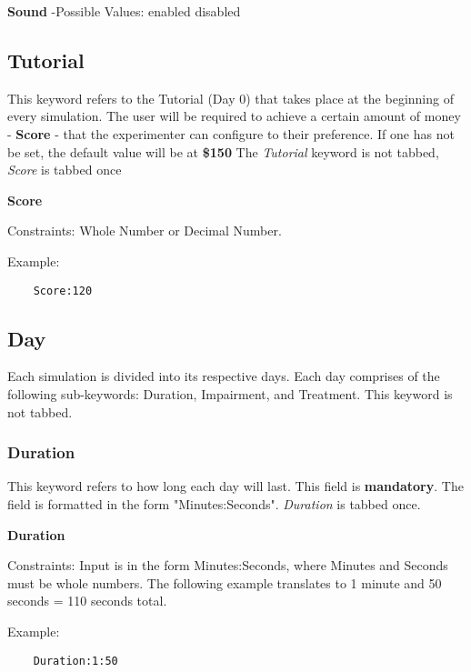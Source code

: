 \documentclass{article}
\begin{document}
\noindent \textbf{Sound} \newline
\indent -Possible Values: \newline
\indent\indent enabled \newline
\indent\indent disabled \newline

\subsection{Tutorial}
This keyword refers to the Tutorial (Day 0) that takes place at the beginning of every simulation. The user will be required to achieve a certain amount of money - \textbf{Score} - that the experimenter can configure to their preference. If one has not be set, the default value will be at \textbf{\$150} The \textit{Tutorial} keyword is not tabbed, \textit{Score} is tabbed once\newline

\noindent \textbf{Score}

\indent Constraints: Whole Number or Decimal Number.\newline

\noindent Example:
\begin{lstlisting}
    Score:120
\end{lstlisting}


\subsection{Day}
Each simulation is divided into its respective days. Each day comprises of the following sub-keywords: Duration, Impairment, and Treatment. This keyword is not tabbed.

\subsubsection{Duration}
This keyword refers to how long each day will last. This field is \textbf{mandatory}. The field is formatted in the form "Minutes:Seconds". \textit{Duration} is tabbed once. \newline

\noindent \textbf{Duration}

\indent Constraints: Input is in the form Minutes:Seconds, where Minutes and Seconds must be whole numbers. The following example translates to 1 minute and 50 seconds = 110 seconds total.\newline

\noindent Example:
\begin{lstlisting}
    Duration:1:50
\end{lstlisting}
\end{document}

